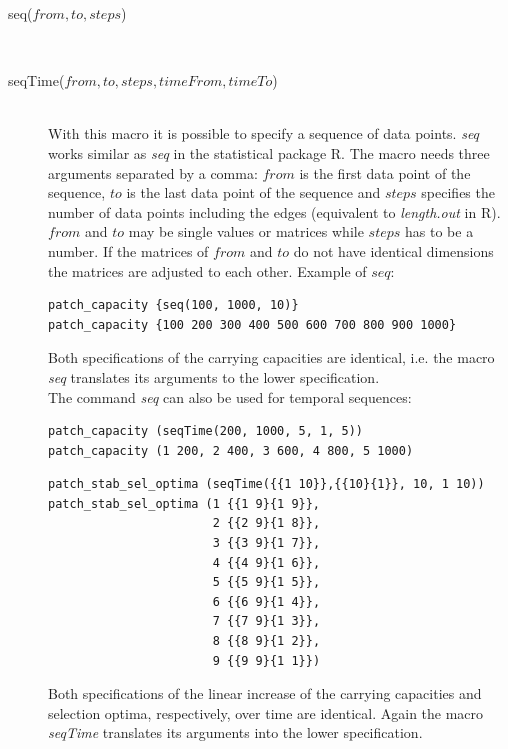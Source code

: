 \documentclass[letterpaper,12pt,oneside]{book}
\begin{document}
\begin{description}
\item[seq($from, to, steps$)]\hspace*{\fill}\\
\vspace{-9mm}
\item[seqTime($from, to, steps, timeFrom, timeTo$)]\hspace*{\fill}\\
With this macro it is possible to specify a sequence of data points. \textit{seq} works similar as \textit{seq} in the statistical package R. The macro needs three arguments separated by a comma: $from$ is the first data point of the sequence, $to$ is the last data point of the sequence and $steps$ specifies the number of data points including the edges (equivalent to \textit{length.out} in R). $from$ and $to$ may be single values or matrices while $steps$ has to be a number. If the matrices of $from$ and $to$ do not have identical dimensions the matrices are adjusted to each other. Example of $seq$:
\begin{lstlisting}[frame=single]
patch_capacity {seq(100, 1000, 10)}
patch_capacity {100 200 300 400 500 600 700 800 900 1000}
\end{lstlisting}
Both specifications of the carrying capacities are identical, i.e. the macro \textit{seq} translates its arguments to the lower specification.\\
The command \textit{seq} can also be used for temporal sequences:
\begin{lstlisting}[frame=single]
patch_capacity (seqTime(200, 1000, 5, 1, 5))
patch_capacity (1 200, 2 400, 3 600, 4 800, 5 1000)
\end{lstlisting}
\begin{lstlisting}[frame=single]
patch_stab_sel_optima (seqTime({{1 10}},{{10}{1}}, 10, 1 10))
patch_stab_sel_optima (1 {{1 9}{1 9}}, 
                       2 {{2 9}{1 8}}, 
                       3 {{3 9}{1 7}}, 
                       4 {{4 9}{1 6}}, 
                       5 {{5 9}{1 5}}, 
                       6 {{6 9}{1 4}}, 
                       7 {{7 9}{1 3}}, 
                       8 {{8 9}{1 2}}, 
                       9 {{9 9}{1 1}})
\end{lstlisting}
Both specifications of the linear increase of the carrying capacities and selection optima, respectively, over time are identical. Again the macro \textit{seqTime} translates its arguments into the lower specification.     


\end{description}
\end{document}
